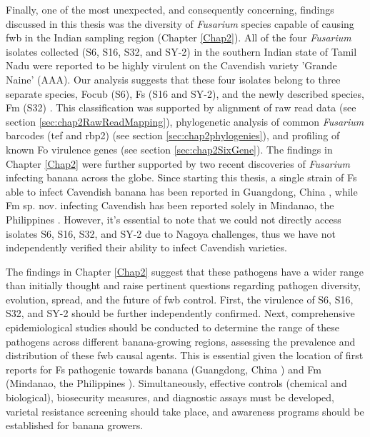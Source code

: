 Finally, one of the most unexpected, and consequently concerning, findings discussed in this thesis was the diversity of \textit{Fusarium} species capable of causing \ac{fwb} in the Indian sampling region (Chapter \ref{Chap2}). All of the four \textit{Fusarium} isolates collected (S6, S16, S32, and SY-2) in the southern Indian state of Tamil Nadu were reported to be highly virulent on the Cavendish variety 'Grande Naine' (AAA). Our analysis suggests that these four isolates belong to three separate species, \acf{Focub} (S6), \acf{Fs} (S16 and SY-2), and the newly described species, \acf{Fm} (S32) \parencite{Nozawa2023}. This classification was supported by alignment of raw read data (see section \ref{sec:chap2RawReadMapping}), phylogenetic analysis of common \textit{Fusarium} barcodes (\ac{tef} and \ac{rbp2}) (see section \ref{sec:chap2phylogenies}), and profiling of known \ac{Fo} virulence genes (see section \ref{sec:chap2SixGene}). The findings in Chapter \ref{Chap2} were further supported by two recent discoveries of \textit{Fusarium} infecting banana across the globe. Since starting this thesis, a single strain of \ac{Fs} able to infect Cavendish banana has been reported in Guangdong, China \parencite{Cui2021}, while \ac{Fm} sp. nov. infecting Cavendish has been reported solely in Mindanao, the Philippines \parencite{Nozawa2023}. However, it's essential to note that we could not directly access isolates S6, S16, S32, and SY-2 due to Nagoya challenges, thus we have not independently verified their ability to infect Cavendish varieties.

The findings in Chapter \ref{Chap2} suggest that these pathogens have a wider range than initially thought and raise pertinent questions regarding pathogen diversity, evolution, spread, and the future of \ac{fwb} control. First, the virulence of S6, S16, S32, and SY-2 should be further independently confirmed. Next, comprehensive epidemiological studies should be conducted to determine the range of these pathogens across different banana-growing regions, assessing the prevalence and distribution of these \ac{fwb} causal agents. This is essential given the location of first reports for \ac{Fs} pathogenic towards banana (Guangdong, China \parencite{Cui2021}) and \ac{Fm} (Mindanao, the Philippines \parencite{Nozawa2023}). Simultaneously, effective controls (chemical and biological), biosecurity measures, and diagnostic assays must be developed, varietal resistance screening should take place, and awareness programs should be established for banana growers. 

